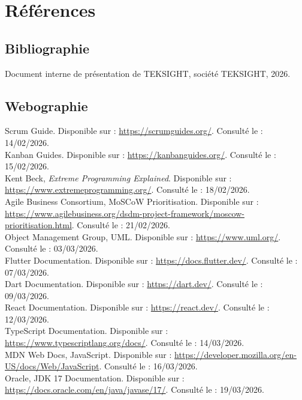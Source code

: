 \chapter*{Références}

\section*{Bibliographie}
\noindent [1] Document interne de présentation de TEKSIGHT, société TEKSIGHT, 2026.

\section*{Webographie}
\noindent [2] Scrum Guide. Disponible sur : \url{https://scrumguides.org/}. Consulté le : 14/02/2026.\\
\noindent [3] Kanban Guides. Disponible sur : \url{https://kanbanguides.org/}. Consulté le : 15/02/2026.\\
\noindent [4] Kent Beck, \textit{Extreme Programming Explained}. Disponible sur : \url{https://www.extremeprogramming.org/}. Consulté le : 18/02/2026.\\
\noindent [5] Agile Business Consortium, MoSCoW Prioritisation. Disponible sur : \url{https://www.agilebusiness.org/dsdm-project-framework/moscow-prioritisation.html}. Consulté le : 21/02/2026.\\
\noindent [6] Object Management Group, UML. Disponible sur : \url{https://www.uml.org/}. Consulté le : 03/03/2026.\\
\noindent [7] Flutter Documentation. Disponible sur : \url{https://docs.flutter.dev/}. Consulté le : 07/03/2026.\\
\noindent [8] Dart Documentation. Disponible sur : \url{https://dart.dev/}. Consulté le : 09/03/2026.\\
\noindent [9] React Documentation. Disponible sur : \url{https://react.dev/}. Consulté le : 12/03/2026.\\
\noindent [10] TypeScript Documentation. Disponible sur : \url{https://www.typescriptlang.org/docs/}. Consulté le : 14/03/2026.\\
\noindent [11] MDN Web Docs, JavaScript. Disponible sur : \url{https://developer.mozilla.org/en-US/docs/Web/JavaScript}. Consulté le : 16/03/2026.\\
\noindent [12] Oracle, JDK 17 Documentation. Disponible sur : \url{https://docs.oracle.com/en/java/javase/17/}. Consulté le : 19/03/2026.\\
